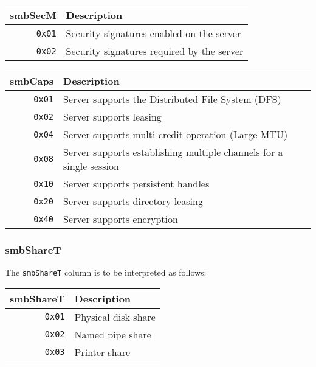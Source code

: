 \documentclass[documentation]{subfiles}
\begin{document}
\begin{longtable}{rl}
    \toprule
    {\bf smbSecM} & {\bf Description}\\
    \midrule\endhead%
    {\tt 0x01} & Security signatures enabled on the server\\
    {\tt 0x02} & Security signatures required by the server\\
    \bottomrule
\end{longtable}

\begin{longtable}{rl}
    \toprule
    {\bf smbCaps} & {\bf Description}\\
    \midrule\endhead%
    {\tt 0x01} & Server supports the Distributed File System (DFS)\\
    {\tt 0x02} & Server supports leasing\\
    {\tt 0x04} & Server supports multi-credit operation (Large MTU)\\
    {\tt 0x08} & Server supports establishing multiple channels for a single session\\
    {\tt 0x10} & Server supports persistent handles\\
    {\tt 0x20} & Server supports directory leasing\\
    {\tt 0x40} & Server supports encryption\\
    \bottomrule
\end{longtable}

\subsubsection{smbShareT}\label{smbShareT}
The {\tt smbShareT} column is to be interpreted as follows:

\begin{longtable}{rl}
    \toprule
    {\bf smbShareT} & {\bf Description}\\
    \midrule\endhead%
    {\tt 0x01} & Physical disk share\\
    {\tt 0x02} & Named pipe share\\
    {\tt 0x03} & Printer share\\
    \bottomrule
\end{longtable}
\end{document}
